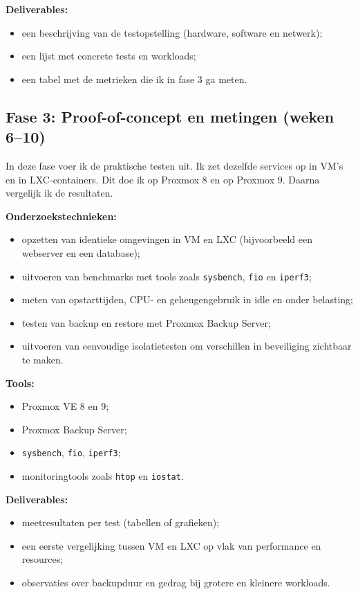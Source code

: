 \textbf{Deliverables:}
\begin{itemize}
    \item een beschrijving van de testopstelling (hardware, software en netwerk);
    \item een lijst met concrete tests en workloads;
    \item een tabel met de metrieken die ik in fase 3 ga meten.
\end{itemize}

\subsection{Fase 3: Proof-of-concept en metingen (weken 6–10)}

In deze fase voer ik de praktische testen uit. Ik zet dezelfde services op in VM's en in LXC-containers. Dit doe ik op Proxmox 8 en op Proxmox 9. Daarna vergelijk ik de resultaten.

\textbf{Onderzoekstechnieken:}
\begin{itemize}
    \item opzetten van identieke omgevingen in VM en LXC (bijvoorbeeld een webserver en een database);
    \item uitvoeren van benchmarks met tools zoals \texttt{sysbench}, \texttt{fio} en \texttt{iperf3};
    \item meten van opstarttijden, CPU- en geheugengebruik in idle en onder belasting;
    \item testen van backup en restore met Proxmox Backup Server;
    \item uitvoeren van eenvoudige isolatietesten om verschillen in beveiliging zichtbaar te maken.
\end{itemize}

\textbf{Tools:}
\begin{itemize}
    \item Proxmox VE 8 en 9;
    \item Proxmox Backup Server;
    \item \texttt{sysbench}, \texttt{fio}, \texttt{iperf3};
    \item monitoringtools zoals \texttt{htop} en \texttt{iostat}.
\end{itemize}

\textbf{Deliverables:}
\begin{itemize}
    \item meetresultaten per test (tabellen of grafieken);
    \item een eerste vergelijking tussen VM en LXC op vlak van performance en resources;
    \item observaties over backupduur en gedrag bij grotere en kleinere workloads.
\end{itemize}

